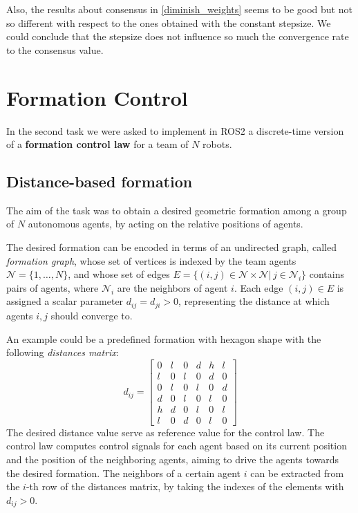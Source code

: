 \documentclass[a4paper,11pt,oneside]{book}
\begin{document}
Also, the results about consensus in \ref{diminish_weights} seems to be good but not so different with respect to the ones obtained with the constant stepsize. We could conclude that the stepsize does not influence so much the convergence rate to the consensus value.


\chapter{Formation Control} 
 In the second task we were asked to implement in ROS2 a discrete-time version of a \textbf{formation control law} for a team of $N$ robots.

\section{Distance-based formation}
The aim of the task was to obtain a desired geometric formation among a group of $N$ autonomous agents, by acting on the relative positions of agents.

\bigskip
The desired formation can be encoded in terms of an undirected graph, called \textit{formation graph}, whose set of vertices is indexed by the team agents $\mathcal{N} =\{ 1, \ldots, N\}$, and whose set of edges $E=\{(i,j) \in \mathcal{N} \times \mathcal{N} | \, j \in \mathcal{N}_i\}$ contains pairs of agents, where $\mathcal{N}_i$ are the neighbors of agent $i$. Each edge $(i,j) \in E$ is assigned a scalar parameter $d_{ij} = d_{ji} > 0$, representing the distance at which agents $i,j$ should converge to. 

An example could be a predefined formation with hexagon shape with the following \textit{distances matrix}:
\begin{equation}
d_{ij} =
\begin{bmatrix}
0 & l & 0 & d & h & l \\
l & 0 & l & 0 & d & 0 \\
0 & l & 0 & l & 0 & d \\
d & 0 & l & 0 & l & 0 \\
h & d & 0 & l & 0 & l \\
l & 0 & d & 0 & l & 0
\end{bmatrix}
\end{equation}
The desired distance value serve as reference value for the control law. The control law computes control signals for each agent based on its current position and the position of the neighboring agents, aiming to drive the agents towards the desired formation.
The neighbors of a certain agent $i$ can be extracted from the $i$-th row of the distances matrix, by taking the indexes of the elements with $d_{ij} > 0$.
\end{document}
